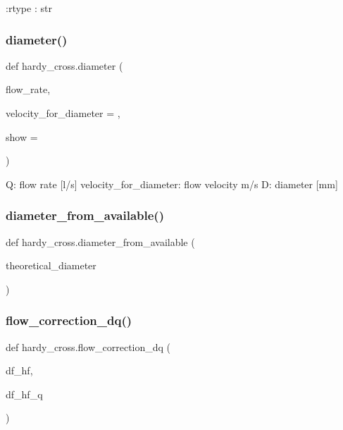 \begin{DoxyVerb}:rtype : str
\end{DoxyVerb}
 \mbox{\label{namespacehardy__cross_a5b3a76084af3f0bb912856c7c3a297d0}} 
\subsubsection{diameter()}
{\footnotesize\ttfamily def hardy\+\_\+cross.\+diameter (\begin{DoxyParamCaption}\item[{}]{flow\+\_\+rate,  }\item[{}]{velocity\+\_\+for\+\_\+diameter = {},  }\item[{}]{show = {} }\end{DoxyParamCaption})}

\begin{DoxyVerb}Q: flow rate [l/s]
velocity_for_diameter: flow velocity m/s
D: diameter [mm]
\end{DoxyVerb}
 \mbox{\label{namespacehardy__cross_a554c5e38cee0615fabc782ad512e19e2}} 
\subsubsection{diameter\+\_\+from\+\_\+available()}
{\footnotesize\ttfamily def hardy\+\_\+cross.\+diameter\+\_\+from\+\_\+available (\begin{DoxyParamCaption}\item[{}]{theoretical\+\_\+diameter }\end{DoxyParamCaption})}

\mbox{\label{namespacehardy__cross_a62062bfea7848e6ebc3a6dd92f252e50}} 
\subsubsection{flow\+\_\+correction\+\_\+dq()}
{\footnotesize\ttfamily def hardy\+\_\+cross.\+flow\+\_\+correction\+\_\+dq (\begin{DoxyParamCaption}\item[{}]{df\+\_\+hf,  }\item[{}]{df\+\_\+hf\+\_\+q }\end{DoxyParamCaption})}

